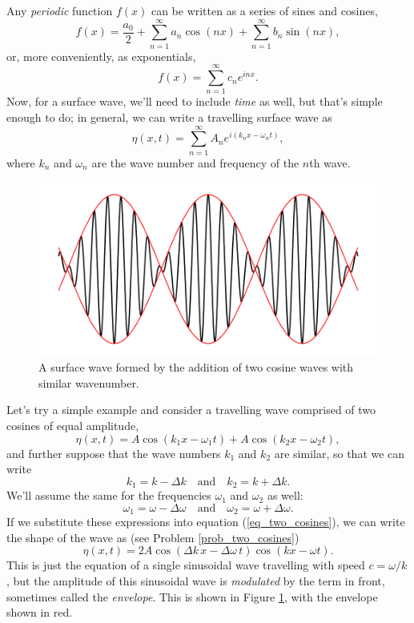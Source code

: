 Any \emph{periodic} function $f(x)$ can be written as a series of sines and cosines,
\[
f(x) = \frac{a_0}{2} + \sum_{n=1}^{\infty} a_n \cos(nx) +  \sum_{n=1}^{\infty} b_n \sin(nx),
\]
or, more conveniently, as exponentials,
\begin{equation}
\label{eq_fourier_series}
f(x) = \sum_{n=1}^\infty c_n e^{inx}.
\end{equation}
Now, for a surface wave, we'll need to include \emph{time} as well, but that's simple enough to do; in general, we can write a travelling surface wave as
\begin{equation}
\label{eq_fourier_waves}
\eta(x, t) = \sum_{n=1}^\infty A_n e^{i(k_n x - \omega_n t)},
\end{equation}
where $k_n$ and $\omega_n$ are the wave number and frequency of the $n$th wave.

\begin{figure}
\centering\includegraphics[width=0.8\linewidth]{Figures/Chapter5/fig_two_cosines}
\caption{A surface wave formed by the addition of two cosine waves with similar wavenumber.}
\label{fig_two_cosines}
\end{figure}

\begin{example}
Let's try a simple example and consider a travelling wave comprised of two cosines of equal amplitude,
\begin{equation}
\label{eq_two_cosines}
\eta(x, t) = A \cos(k_1 x - \omega_1 t) + A \cos(k_2 x - \omega_2 t),
\end{equation}
and further suppose that the wave numbers $k_1$ and $k_2$ are similar, so that we can write
\[
k_1 = k - \Delta k \quad \text{and} \quad k_2 = k + \Delta k.
\]
We'll assume the same for the frequencies $\omega_1$ and $\omega_2$ as well:
\[
\omega_1 = \omega - \Delta \omega \quad \text{and} \quad \omega_2 = \omega + \Delta \omega.
\]
If we substitute these expressions into equation (\ref{eq_two_cosines}), we can write the shape of the wave as (see Problem \ref{prob_two_cosines})
\begin{equation}
\label{eq_two_cosines_ans}
\eta(x, t) = 2A \cos(\Delta k \, x - \Delta \omega \, t) \cos(kx - \omega t).
\end{equation}
This is just the equation of a single sinusoidal wave travelling with speed $c = \omega/k$, but the amplitude of this sinusoidal wave is \emph{modulated} by the term in front, sometimes called the \emph{envelope}.  This is shown in Figure \ref{fig_two_cosines}, with the envelope shown in red.
\end{example}



